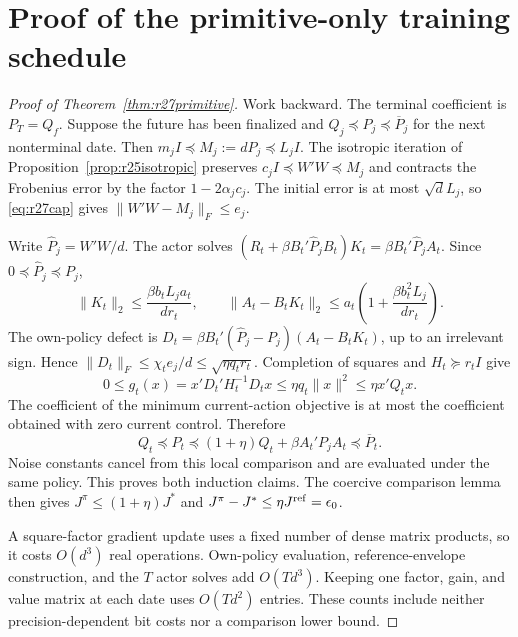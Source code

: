 \section{Proof of the primitive-only training schedule}
\label{sec:r27primitiveproof}
\begin{proof}[Proof of Theorem~\ref{thm:r27primitive}]
Work backward. The terminal coefficient is $P_T=Q_f$. Suppose the future has
been finalized and $Q_j\preceq P_j\preceq\overline P_j$ for the next
nonterminal date. Then $m_jI\preceq M_j:=dP_j\preceq L_jI$. The isotropic
iteration of Proposition~\ref{prop:r25isotropic} preserves
$c_jI\preceq W'W\preceq M_j$ and contracts the Frobenius error by the factor
$1-2\alpha_jc_j$. The initial error is at most $\sqrt d L_j$, so
\eqref{eq:r27cap} gives $\|W'W-M_j\|_F\leq e_j$.

Write $\widehat P_j=W'W/d$. The actor solves
$(R_t+\beta B_t'\widehat P_jB_t)K_t=\beta B_t'\widehat P_jA_t$.
Since $0\preceq\widehat P_j\preceq P_j$,
\[
 \|K_t\|_2\leq\frac{\beta b_t L_j a_t}{dr_t},\qquad
 \|A_t-B_tK_t\|_2\leq
 a_t\left(1+\frac{\beta b_t^2 L_j}{dr_t}\right).
\]
The own-policy defect is
$D_t=\beta B_t'(\widehat P_j-P_j)(A_t-B_tK_t)$, up to an irrelevant sign.
Hence $\|D_t\|_F\leq\chi_te_j/d\leq\sqrt{\eta q_tr_t}$.
Completion of squares and $H_t\succeq r_tI$ give
\[
 0\leq g_t(x)=x'D_t'H_t^{-1}D_tx
 \leq\eta q_t\|x\|^2\leq\eta x'Q_tx.
\]
The coefficient of the minimum current-action objective is at most the
coefficient obtained with zero current control. Therefore
\[
 Q_t\preceq P_t\preceq(1+\eta)Q_t+\beta A_t'P_jA_t
 \preceq\overline P_t.
\]
Noise constants cancel from this local comparison and are evaluated under the
same policy. This proves both induction claims. The coercive comparison
lemma then gives $J^\pi\leq(1+\eta)J^*$ and
$J^\pi-J^*\leq\eta J^{\rm ref}=\epsilon_0$.

A square-factor gradient update uses a fixed number of dense matrix products,
so it costs $O(d^3)$ real operations. Own-policy evaluation, reference-envelope
construction, and the $T$ actor solves add $O(Td^3)$. Keeping one factor,
gain, and value matrix at each date uses $O(Td^2)$ entries. These counts include
neither precision-dependent bit costs nor a comparison lower bound.
\end{proof}
